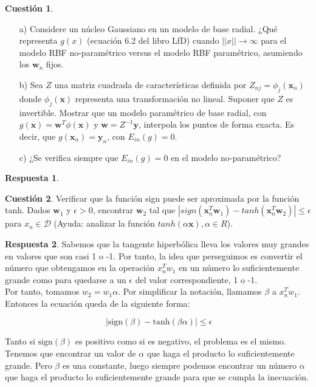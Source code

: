 \documentclass[10pt,a4paper]{article}
\theoremstyle{definition}
\newtheorem{cuestion}{Cuestión}
\newtheorem*{respuesta}{Respuesta}
\begin{document}
\begin{cuestion}
\begin{enumerate}
\item[a)] Considere un núcleo Gaussiano en un modelo de base radial. ¿Qué representa $g(x)$ (ecuación 6.2 del libro LfD) cuando $||x|| \rightarrow \infty$ para el modelo RBF no-paramétrico versus el modelo RBF paramétrico, asumiendo los $\mathbf{w}_n$ fijos.
\item[b)] Sea $Z$ una matriz cuadrada de características definida por $Z_{nj} = \phi_j(\mathbf{x}_n)$ donde $\phi_j(\mathbf{x})$ representa una transformación no lineal. Suponer que $Z$ es invertible. Mostrar que un modelo paramétrico de base radial, con $g(\mathbf{x}) = \mathbf{w}^T \phi(\mathbf{x})$ y $\mathbf{w} = Z^{-1}\mathbf{y}$, interpola los puntos de forma exacta. Es decir, que $g(\mathbf{x}_n) = \mathbf{y}_n$, con $E_{in}(g)=0$.
\item[c)] ¿Se verifica siempre que $E_{in}(g)=0$ en el modelo no-paramétrico?
\end{enumerate}

\end{cuestion}
\begin{respuesta}
\end{respuesta}

\begin{cuestion}
Verificar que la función sign puede ser aproximada por la función tanh. Dados $\mathbf{w}_1$ y $\epsilon > 0$, encontrar $\mathbf{w}_2$ tal que $|sign(\mathbf{x}_n^T \mathbf{w}_1) - tanh(\mathbf{x}_n^T \mathbf{w}_2)| \leq \epsilon$ para $x_n \in \mathcal{D}$ (Ayuda: analizar la función $tanh(\alpha \mathbf{x}), \alpha \in R$).\\
\end{cuestion}
\begin{respuesta}
Sabemos que la tangente hiperbólica lleva los valores muy grandes en valores que son casi 1 o -1. Por tanto, la idea que perseguimos es convertir el número que obtengamos en la operación $x_n^Tw_1$ en un número lo suficientemente grande como para quedarse a un $\epsilon$ del valor correspondiente, 1 o -1.\\

Por tanto, tomamos $w_2 =  w_1 \alpha$. Por simplificar la notación, llamamos $\beta$ a $x_n^Tw_1$. Entonces la ecuación queda de la siguiente forma:

\[
\ \left| \textrm{sign}(\beta)- \textrm{tanh}(\beta \alpha)\right| \leq \epsilon
\]

Tanto si $\textrm{sign}(\beta)$ es positivo como si es negativo, el problema es el mismo. Tenemos que encontrar un valor de $\alpha$ que haga el producto lo suficientemente grande. Pero $\beta$ es una constante, luego siempre podemos encontrar un número $\alpha$ que haga el producto lo suficientemente grande para que se cumpla la inecuación. 
\end{respuesta}
\end{document}
